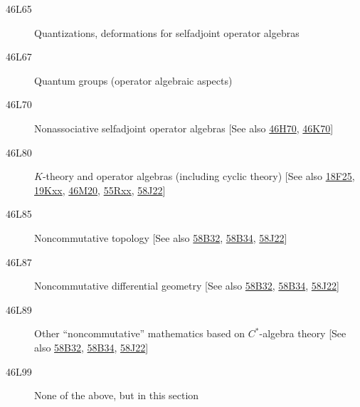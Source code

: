 \begin{description}
\item [46L65]\label{46L65} Quantizations, deformations for selfadjoint operator algebras
\item [46L67]\label{46L67} Quantum groups (operator algebraic aspects)
\item [46L70]\label{46L70} Nonassociative selfadjoint operator algebras [See also \hyperref[46H70]{46H70}, \hyperref[46K70]{46K70}]
\item [46L80]\label{46L80} $K$-theory and operator algebras (including cyclic theory) [See also \hyperref[18F25]{18F25}, \hyperref[19Kxx]{19Kxx}, \hyperref[46M20]{46M20}, \hyperref[55Rxx]{55Rxx}, \hyperref[58J22]{58J22}]
\item [46L85]\label{46L85} Noncommutative topology [See also \hyperref[58B32]{58B32}, \hyperref[58B34]{58B34}, \hyperref[58J22]{58J22}]
\item [46L87]\label{46L87} Noncommutative differential geometry [See also \hyperref[58B32]{58B32}, \hyperref[58B34]{58B34}, \hyperref[58J22]{58J22}]
\item [46L89]\label{46L89} Other ``noncommutative'' mathematics based on $C^*$-algebra theory [See also \hyperref[58B32]{58B32}, \hyperref[58B34]{58B34}, \hyperref[58J22]{58J22}]
\item [46L99]\label{46L99} None of the above, but in this section
\end{description}
